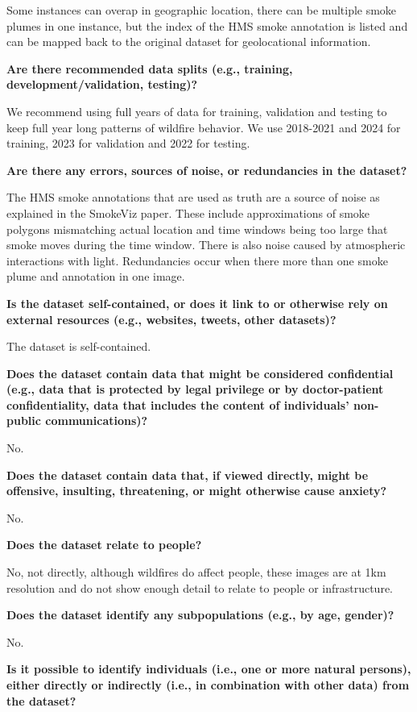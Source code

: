 \documentclass{article}
\begin{document}
Some instances can overap in geographic location, there can be multiple smoke plumes in one instance, but the index of the HMS smoke annotation is listed and can be mapped back to the original dataset for geolocational information.

\textbf{Are there recommended data splits (e.g., training, development/validation, testing)?}

We recommend using full years of data for training, validation and testing to keep full year long patterns of wildfire behavior. We use 2018-2021 and 2024 for training, 2023 for validation and 2022 for testing.

\textbf{Are there any errors, sources of noise, or redundancies in the dataset?}

The HMS smoke annotations that are used as truth are a source of noise as explained in the SmokeViz paper. These include approximations of smoke polygons mismatching actual location and time windows being too large that smoke moves during the time window. There is also noise caused by atmospheric interactions with light. Redundancies occur when there more than one smoke plume and annotation in one image.

\textbf{Is the dataset self-contained, or does it link to or otherwise rely on external resources (e.g., websites, tweets, other datasets)?}

The dataset is self-contained.

\textbf{Does the dataset contain data that might be considered confidential (e.g., data that is protected by legal privilege or by doctor-patient confidentiality, data that includes the content of individuals’ non-public communications)?}

No.

\textbf{Does the dataset contain data that, if viewed directly, might be offensive, insulting, threatening, or might otherwise cause anxiety?}

No.

\textbf{Does the dataset relate to people? }

No, not directly, although wildfires do affect people, these images are at 1km resolution and do not show enough detail to relate to people or infrastructure.

\textbf{Does the dataset identify any subpopulations (e.g., by age, gender)?}

No.

\textbf{Is it possible to identify individuals (i.e., one or more natural persons), either directly or indirectly (i.e., in combination with other data) from the dataset?}
\end{document}

